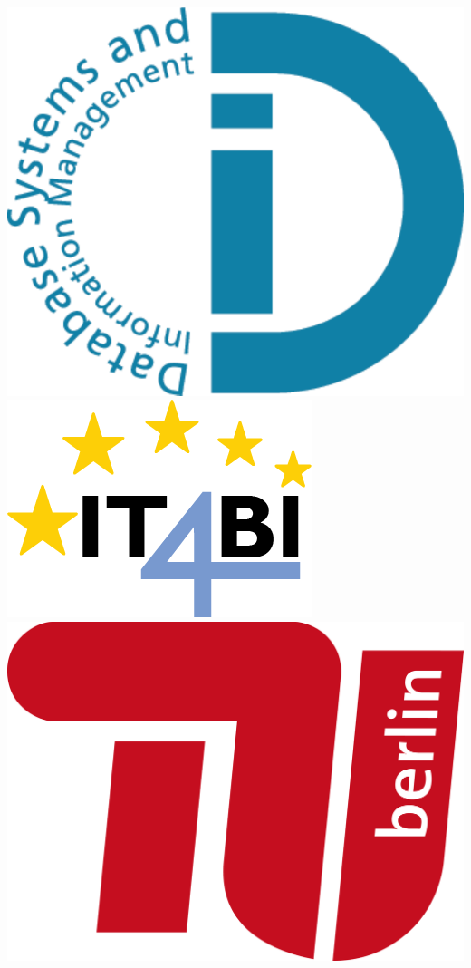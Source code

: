 \documentclass[%
   a4paper,%
  11pt,                    %
  oneside,
  openright,              %
  headsepline,          %
  cleardoubleempty,
  chapterprefix,
  titlepage,%
  liststotoc,%
  bibtotoc,%
  idxtotoc,%
  headinclude,           %
  pointlessnumbers,%
  USenglish
  ]{scrbook}
\theoremstyle{break}
\begin{document}
\begin{titlepage}
\begin{center}
 
\includegraphics[height=0.13\textheight]{logo_dima.pdf}
\hfill
\includegraphics[height=0.15\textheight]{logo_it4bi.png}
\hfill
\includegraphics[height=0.13\textheight]{tub_logo.png}
 

\end{center}
\end{titlepage}
\end{document}
